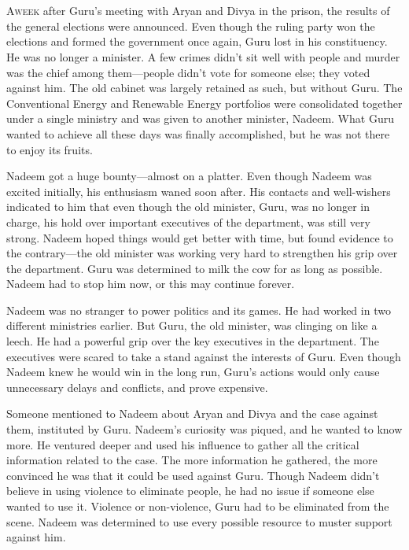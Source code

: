 \chapter{}

\lettrine{A}{week} after Guru's meeting with Aryan and Divya in the prison, the
results of the general elections were announced. Even though the ruling party
won the elections and formed the government once again, Guru lost in his
constituency. He was no longer a minister. A few crimes didn't sit well with
people and murder was the chief among them—people didn't vote for someone else;
they voted against him. The old cabinet was largely retained as such, but
without Guru. The Conventional Energy and Renewable Energy portfolios were
consolidated together under a single ministry and was given to another minister,
Nadeem. What Guru wanted to achieve all these days was finally accomplished, but
he was not there to enjoy its fruits.

Nadeem got a huge bounty—almost on a platter. Even though Nadeem was excited
initially, his enthusiasm waned soon after. His contacts and well-wishers
indicated to him that even though the old minister, Guru, was no longer in
charge, his hold over important executives of the department, was still very
strong. Nadeem hoped things would get better with time, but found evidence to
the contrary—the old minister was working very hard to strengthen his grip over
the department. Guru was determined to milk the cow for as long as possible.
Nadeem had to stop him now, or this may continue forever.

Nadeem was no stranger to power politics and its games. He had worked in two
different ministries earlier. But Guru, the old minister, was clinging on like a
leech. He had a powerful grip over the key executives in the department. The
executives were scared to take a stand against the interests of Guru. Even
though Nadeem knew he would win in the long run, Guru's actions would only cause
unnecessary delays and conflicts, and prove expensive.

Someone mentioned to Nadeem about Aryan and Divya and the case against them,
instituted by Guru. Nadeem's curiosity was piqued, and he wanted to know more.
He ventured deeper and used his influence to gather all the critical information
related to the case. The more information he gathered, the more convinced he was
that it could be used against Guru. Though Nadeem didn't believe in using
violence to eliminate people, he had no issue if someone else wanted to use it.
Violence or non-violence, Guru had to be eliminated from the scene.  Nadeem was
determined to use every possible resource to muster support against him.

